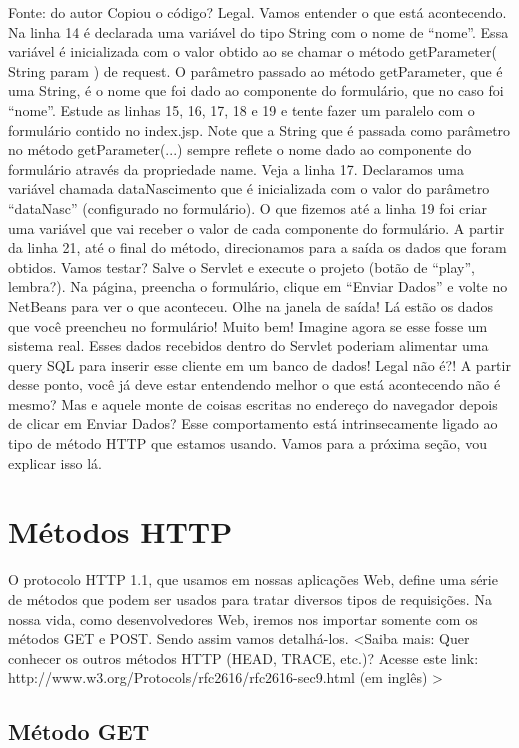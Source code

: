 Fonte: do autor
Copiou o código? Legal. Vamos entender o que está acontecendo. Na linha 14 é declarada uma variável do tipo String com o nome de ``nome''. Essa variável é inicializada com o valor obtido ao se chamar o método getParameter( String param ) de request. O parâmetro passado ao método getParameter, que é uma String, é o nome que foi dado ao componente do formulário, que no caso foi ``nome''. Estude as linhas 15, 16, 17, 18 e 19 e tente fazer um paralelo com o formulário contido no index.jsp. Note que a String que é passada como parâmetro no método getParameter(...) sempre reflete o nome dado ao componente do formulário através da propriedade name. Veja a linha 17. Declaramos uma variável chamada dataNascimento que é inicializada com o valor do parâmetro ``dataNasc'' (configurado no formulário).
O que fizemos até a linha 19 foi criar uma variável que vai receber o valor de cada componente do formulário. A partir da linha 21, até o final do método, direcionamos para a saída os dados que foram obtidos. Vamos testar? Salve o Servlet e execute o projeto (botão de ``play'', lembra?). Na página, preencha o formulário, clique em ``Enviar Dados'' e volte no NetBeans para ver o que aconteceu. Olhe na janela de saída! Lá estão os dados que você preencheu no formulário! Muito bem! Imagine agora se esse fosse um sistema real. Esses dados recebidos dentro do Servlet poderiam alimentar uma query SQL para inserir esse cliente em um banco de dados! Legal não é?! A partir desse ponto, você já deve estar entendendo melhor o que está acontecendo não é mesmo? Mas e aquele monte de coisas escritas no endereço do navegador depois de clicar em Enviar Dados? Esse comportamento está intrinsecamente ligado ao tipo de método HTTP que estamos usando. Vamos para a próxima seção, vou explicar isso lá.


\section{Métodos HTTP}

O protocolo HTTP 1.1, que usamos em nossas aplicações Web, define uma série de métodos que podem ser usados para tratar diversos tipos de requisições. Na nossa vida, como desenvolvedores Web, iremos nos importar somente com os métodos GET e POST. Sendo assim vamos detalhá-los.
<Saiba mais:
Quer conhecer os outros métodos HTTP (HEAD, TRACE, etc.)? Acesse este link: http://www.w3.org/Protocols/rfc2616/rfc2616-sec9.html (em inglês)
>


\subsection{Método GET}

